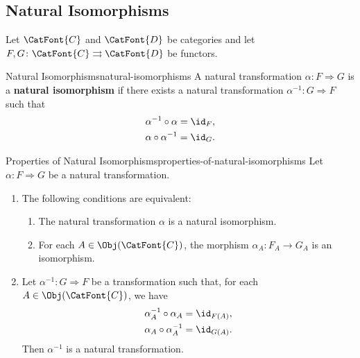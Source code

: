 \subsection{Natural Isomorphisms}\label{subsection-natural-isomorphisms}
Let $\CatFont{C}$ and $\CatFont{D}$ be categories and let $F,G\colon\CatFont{C}\rightrightarrows\CatFont{D}$ be functors.
\begin{definition}{Natural Isomorphisms}{natural-isomorphisms}%
    A natural transformation $\alpha\colon F\Longrightarrow G$ is a \textbf{natural isomorphism} if there exists a natural transformation $\alpha^{-1}\colon G\Longrightarrow F$ such that
    \begin{align*}
        \alpha^{-1}\circ\alpha=\id_{F},\\
        \alpha\circ\alpha^{-1}=\id_{G}.
    \end{align*}
\end{definition}
\begin{proposition}{Properties of Natural Isomorphisms}{properties-of-natural-isomorphisms}%
    Let $\alpha\colon F\Longrightarrow G$ be a natural transformation.
    \begin{enumerate}
        \item\label{properties-of-natural-isomorphisms-characterisations}The following conditions are equivalent:
            \begin{enumerate}
                \item\label{properties-of-natural-isomorphisms-characterisations-a}The natural transformation $\alpha$ is a natural isomorphism.
                \item\label{properties-of-natural-isomorphisms-characterisations-b}For each $A\in\Obj(\CatFont{C})$, the morphism $\alpha_{A}\colon F_{A}\to G_{A}$ is an isomorphism.
            \end{enumerate}
        \item\label{properties-of-natural-isomorphisms-componentwise-inverses-of-natural-transformations-assemble-into-natural-transformations}Let $\alpha^{-1}\colon G\Longrightarrow F$ be a transformation such that, for each $A\in\Obj(\CatFont{C})$, we have
            \begin{align*}
                \alpha^{-1}_{A}\circ\alpha_{A} &= \id_{F(A)},\\
                \alpha_{A}\circ\alpha^{-1}_{A} &= \id_{G(A)}.
            \end{align*}
            Then $\alpha^{-1}$ is a natural transformation.
    \end{enumerate}
\end{proposition}
